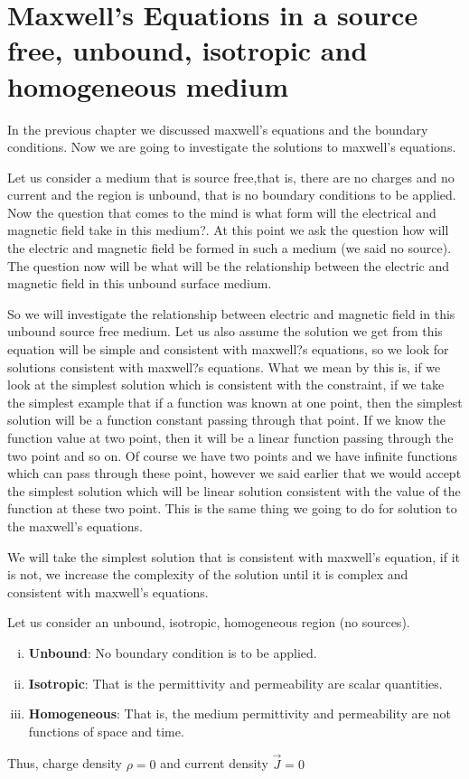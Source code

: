 \chapter{Maxwell's Equations in a source free, unbound, isotropic and homogeneous medium}\label{lec:lec21}

In the previous chapter we discussed maxwell's equations and the boundary conditions. Now we are going to investigate the solutions to maxwell's equations.

Let us consider a medium that is source free,that is, there are no charges and no current and the region is unbound, that is no boundary conditions to be applied. Now the question that comes to the mind is what form will the electrical and magnetic field take in this medium?. At this point we ask the question how will the electric and magnetic field be formed in such a medium (we said no source). The question now will be what will be the relationship between the electric and magnetic field in this unbound surface medium.

So we will investigate the relationship between electric and magnetic field in this unbound source free medium. Let us also assume the solution we get from this equation will be simple and consistent with maxwell?s equations, so we look for solutions consistent with maxwell?s  equations. What we mean by this is, if we look at the simplest solution which is consistent with the constraint, if we take the simplest example that if a function was known at one point, then the simplest solution will be a function constant passing through that point. If we know the function value at two point, then it will be a linear function passing through the two point and so on. Of course we have two points and we have infinite functions which can pass through these point, however we said earlier that we would accept the simplest solution which will be linear solution consistent with the value of the function at these two point. This is the same thing we going to do for solution to the maxwell's equations. 

We will take the simplest solution that is consistent with maxwell's equation, if it is not, we increase the complexity of the solution until it is complex and consistent with maxwell's equations.

Let us consider an unbound, isotropic, homogeneous region (no sources).
\begin{enumerate}[(i)]
\item \textbf{Unbound}: No boundary condition is to be applied.
\item \textbf{Isotropic}: That is the permittivity and permeability are scalar quantities.
\item \textbf{Homogeneous}: That is, the medium permittivity and permeability are not functions of space and time. 
\end{enumerate}
Thus, charge density $\rho=0$ and current density $\vec{J}=0$


